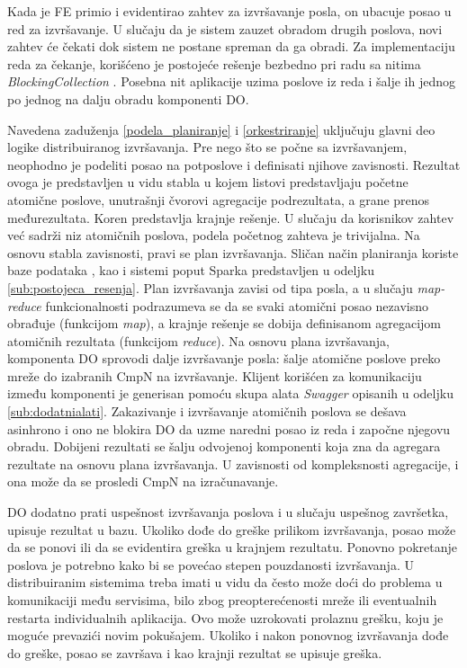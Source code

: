 \documentclass[12pt,oneside]{memoir}
\begin{document}
Kada je FE primio i evidentirao zahtev za izvršavanje posla, on ubacuje posao u red za izvršavanje. U slučaju da je sistem zauzet obradom drugih poslova, novi zahtev će čekati dok sistem ne postane spreman da ga obradi. Za implementaciju reda za čekanje, korišćeno je postojeće rešenje bezbedno pri radu sa nitima \emph{BlockingCollection} \cite{BlockingCollection}. Posebna nit aplikacije uzima poslove iz reda i šalje ih jednog po jednog na dalju obradu komponenti DO.

Navedena zaduženja \ref{podela_planiranje} i \ref{orkestriranje} uključuju glavni deo logike distribuiranog izvršavanja. Pre nego što se počne sa izvršavanjem, neophodno je podeliti posao na potposlove i definisati njihove zavisnosti. Rezultat ovoga je predstavljen u vidu stabla u kojem listovi predstavljaju početne atomične poslove, unutrašnji čvorovi agregacije podrezultata, a grane prenos međurezultata. Koren predstavlja krajnje rešenje. U slučaju da korisnikov zahtev već sadrži niz atomičnih poslova, podela početnog zahteva je trivijalna. Na osnovu stabla zavisnosti, pravi se plan izvršavanja. Sličan način planiranja koriste baze podataka \cite{SQLServerInternals}, kao i sistemi poput Sparka \cite{Spark} predstavljen u odeljku \ref{sub:postojeca_resenja}. Plan izvršavanja zavisi od tipa posla, a u slučaju \emph{map-reduce} funkcionalnosti podrazumeva se da se svaki atomični posao nezavisno obrađuje (funkcijom \emph{map}), a krajnje rešenje se dobija definisanom agregacijom atomičnih rezultata (funkcijom \emph{reduce}). Na osnovu plana izvršavanja, komponenta DO sprovodi dalje izvršavanje posla: šalje atomične poslove preko mreže do izabranih CmpN na izvršavanje. Klijent korišćen za komunikaciju između komponenti je generisan pomoću skupa alata \emph{Swagger} opisanih u odeljku \ref{sub:dodatnialati}. Zakazivanje i izvršavanje atomičnih poslova se dešava asinhrono i ono ne blokira DO da uzme naredni posao iz reda i započne njegovu obradu. Dobijeni rezultati se šalju odvojenoj komponenti koja zna da agregara rezultate na osnovu plana izvršavanja. U zavisnosti od kompleksnosti agregacije, i ona može da se prosledi CmpN na izračunavanje.

DO dodatno prati uspešnost izvršavanja poslova i u slučaju uspešnog završetka, upisuje rezultat u bazu. Ukoliko dođe do greške prilikom izvršavanja, posao može da se ponovi ili da se evidentira greška u krajnjem rezultatu. Ponovno pokretanje poslova je potrebno kako bi se povećao stepen pouzdanosti izvršavanja. U distribuiranim sistemima treba imati u vidu da često može doći do problema u komunikaciji među servisima, bilo zbog preopterećenosti mreže ili eventualnih restarta individualnih aplikacija. Ovo može uzrokovati prolaznu grešku, koju je moguće prevazići novim pokušajem. Ukoliko i nakon ponovnog izvršavanja dođe do greške, posao se završava i kao krajnji rezultat se upisuje greška.
\end{document}
